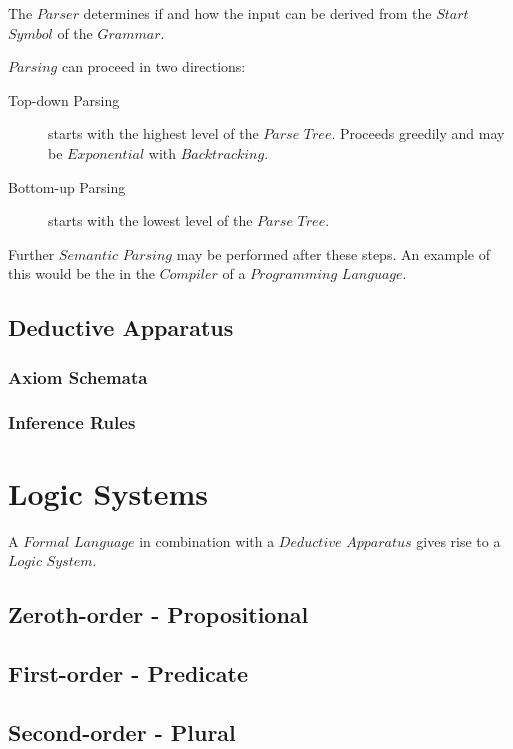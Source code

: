 \documentclass{article}
\begin{document}
    The $Parser$ determines if and how the input can be derived from
    the $Start$ $Symbol$ of the $Grammar$.

    $Parsing$ can proceed in two directions:

    \begin{description}
    \item[Top-down Parsing]
    starts with the highest level of the $Parse$ $Tree$. Proceeds
    greedily and may be $Exponential$ with $Backtracking$.
    \item[Bottom-up Parsing]
    starts with the lowest level of the $Parse$ $Tree$.
    \end{description}

    Further $Semantic$ $Parsing$ may be performed after these
    steps. An example of this would be the in the $Compiler$ of a
    $Programming$ $Language$.

\subsection{Deductive Apparatus}

\subsubsection{Axiom Schemata}

\subsubsection{Inference Rules}

\section{Logic Systems}

A $Formal$ $Language$ in combination with a $Deductive$ $Apparatus$
gives rise to a $Logic$ $System$.

\subsection{Zeroth-order - Propositional}

\subsection{First-order - Predicate}

\subsection{Second-order - Plural}
\end{document}
